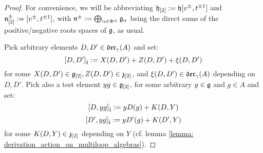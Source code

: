             \begin{proof}
                For convenience, we will be abbreviating $\mathfrak{h}_{[2]} := \mathfrak{h}[v^{\pm}, t^{\pm 1}]$ and $\mathfrak{n}^{\pm}_{[2]} := [v^{\pm}, t^{\pm 1}]$, with $\mathfrak{n}^{\pm} := \bigoplus_{\alpha \in \Phi^{\pm}} \mathfrak{g}_{\alpha}$ being the direct sums of the positive/negative roots spaces of $\mathfrak{g}$, as usual.
            
                Pick arbitrary elements $D, D' \in \mathfrak{der}_{\gamma}(A)$ and set:
                    $$[D, D']_{\hat{\mathfrak{t}}} := X(D, D') + Z(D, D') + \xi(D, D')$$
                for some $X(D, D') \in \mathfrak{g}_{[2]}, Z(D, D') \in \mathfrak{z}_{[2]}$, and $\xi(D, D') \in \mathfrak{der}_{\gamma}(A)$ depending on $D, D'$. Pick also a test element $y g \in \mathfrak{g}_{[2]}$, for some arbitrary $y \in \mathfrak{g}$ and $g \in A$ and set:
                    $$[D, y g]_{\hat{\mathfrak{t}}} := y D( g ) + K(D, Y)$$
                    $$[D', y g]_{\hat{\mathfrak{t}}} := y D'( g ) + K(D', Y)$$
                for some $K(D, Y) \in \mathfrak{z}_{[2]}$ depending on $Y$ (cf. lemma \ref{lemma: derivation_action_on_multiloop_algebras}).
                

\end{proof}
